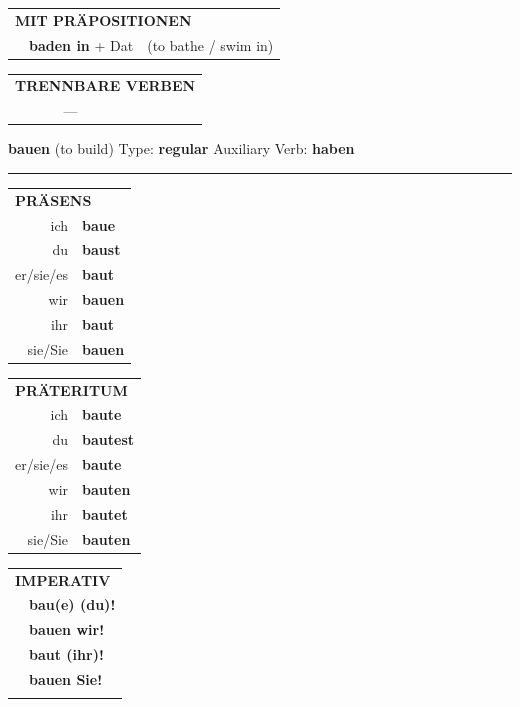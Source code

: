 \documentclass[10pt,a4paper]{revtex4-2}
\begin{document}
\begin{verbbox}
\vspace{10pt}

\begin{tabular}{lll}
\multicolumn{3}{l}{\textbf{MIT PRÄPOSITIONEN}}\\
& \textbf{baden in} + Dat & (to bathe / swim in)\\
\end{tabular}
\hfill
\begin{tabular}{lll}
\multicolumn{3}{l}{\textbf{TRENNBARE VERBEN}}\\
& ---\\
\end{tabular}
\vspace{-5pt}
\end{verbbox}

\begin{verbbox}
    {\Large \bf bauen} (to build) \hfill Type: \textbf{regular} \hfill Auxiliary Verb: \textbf{haben} 
    
     \vspace{5pt}

    \hrule
    
    \vspace{5pt}

  \begin{tabular}{rl}
     \multicolumn{2}{l}{\textbf{PRÄSENS} }\\
    ich & \textbf{baue}\\
    du & \textbf{baust}\\
    er/sie/es & \textbf{baut}\\
    wir & \textbf{bauen}\\
    ihr & \textbf{baut}\\
    sie/Sie & \textbf{bauen}\\
  \end{tabular}
  \hfill
     \begin{tabular}{rl}
    \multicolumn{2}{l}{\textbf{PRÄTERITUM} }\\
    ich & \textbf{baute}\\
    du & \textbf{bautest}\\
    er/sie/es & \textbf{baute}\\
    wir & \textbf{bauten}\\
    ihr & \textbf{bautet}\\
    sie/Sie & \textbf{bauten}\\
  \end{tabular}
  \hfill
  \begin{tabular}{rl}
     \multicolumn{2}{l}{\textbf{IMPERATIV} }\\
   & \textbf{bau(e) (du)!}\\
   & \textbf{bauen wir!}\\
   & \textbf{baut (ihr)!}\\
   & \textbf{bauen Sie!}\\
   & \vspace{10pt}
  \end{tabular}


\end{verbbox}
\end{document}
